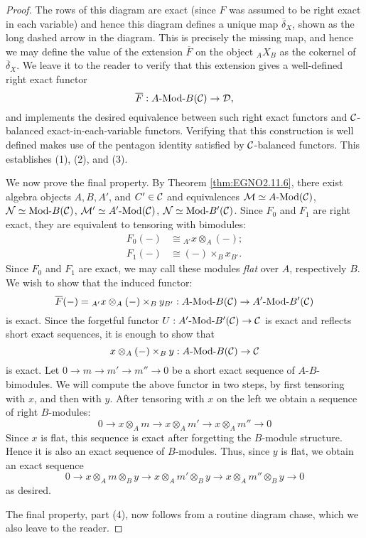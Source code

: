 \documentclass{amsart}
\begin{document}
\begin{proof}
The rows of this diagram are exact (since $F$ was assumed to be right exact in each variable) and hence this diagram defines a unique map $\overline{\delta}_X$, shown as the long dashed arrow in the diagram. This is precisely the missing map, and hence we may define the value of the extension $\overline{F}$ on the object ${}_AX_B$ as the cokernel of $\overline{\delta}_X$. We leave it to the reader to verify that this extension gives a well-defined right exact functor 
\begin{equation*}
	\overline{F}: \Mod{A}{B}(\cC) \to \cD,
\end{equation*} 
and implements the desired equivalence between such right exact functors and $\mathcal C$-balanced exact-in-each-variable functors. Verifying that this construction is well defined makes use of the pentagon identity satisfied by $\mathcal C$-balanced functors. This establishes (1), (2), and (3). 

We now prove the final property. By Theorem \ref{thm:EGNO2.11.6}, there exist algebra objects $A, B, A'$, and $C' \in \mathcal C$ and equivalences $\cM \simeq \Mod{A}{}(\cC)$, $\cN \simeq \Mod{}{B}(\cC)$, $\cM' \simeq \Mod{A'}{}(\cC)$, $\cN \simeq \Mod{}{B'}(\cC)$. Since $F_0$ and $F_1$ are right exact, they are equivalent to tensoring with bimodules:
\begin{align*}
	F_0(-) &\cong {}_{A'}x \otimes_A (-); \\
	F_1(-) & \cong (-) \times_B x_{B'}.
\end{align*}
Since $F_0$ and $F_1$ are exact, we may call these modules {\em flat} over $A$, respectively $B$. We wish to show that the induced functor:
\begin{equation*}
	\overline{F}(-) = {}_{A'}x \otimes_A (-) \times_B y_{B'}: \Mod{A}{B}(\cC) \to \Mod{A'}{B'}(\cC)
\end{equation*}
is exact. Since the forgetful functor $U: \Mod{A'}{B'}(\cC) \to \cC$ is exact and reflects short exact sequences, it is enough to show that 
\begin{equation*}
	x \otimes_A (-) \times_B y: \Mod{A}{B}(\cC) \to \cC
\end{equation*}
is exact. Let $0 \to m \to m' \to m'' \to 0$ be a short exact sequence of $A$-$B$-bimodules. We will compute the above functor in two steps, by first tensoring with $x$, and then with $y$. After tensoring with $x$ on the left we obtain a sequence of right $B$-modules:
\begin{equation*}
	0 \to x \otimes_A m \to x \otimes_A m' \to x \otimes_A {m''} \to 0
\end{equation*}
Since $x$ is flat, this sequence is exact after forgetting the $B$-module structure. Hence it is also an exact sequence of $B$-modules. Thus, since $y$ is flat, we obtain an exact sequence
\begin{equation*}
		0 \to x \otimes_A m \otimes_B y \to x \otimes_A m'\otimes_B y \to x \otimes_A {m''}  \otimes_B y \to 0
\end{equation*}
	as desired. 



The final property, part (4), now follows from a routine diagram chase, which we also leave to the reader. 
\end{proof}
\end{document}

